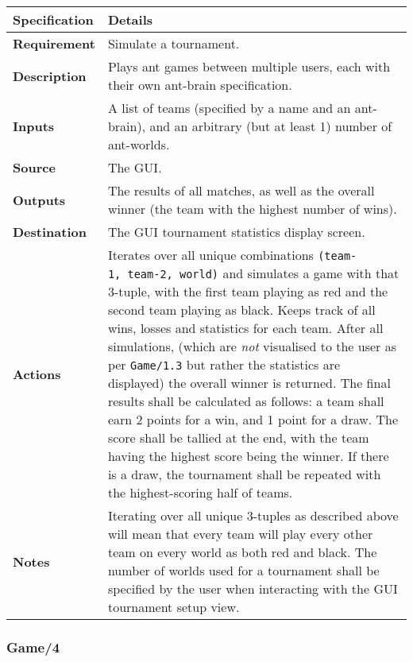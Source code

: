 \documentclass[11pt]{article}
\begin{document}
\begin{longtable}[c]{@{\extracolsep{\fill}}|p{}|p{}|@{}}
\hline
Specification & Details\tabularnewline
\hline

\textbf{Requirement} & Simulate a tournament.\tabularnewline
\textbf{Description} & Plays ant games between multiple users, each with
their own ant-brain specification.\tabularnewline
\textbf{Inputs} & A list of teams (specified by a name and an
ant-brain), and an arbitrary (but at least 1) number of
ant-worlds.\tabularnewline
\textbf{Source} & The GUI.\tabularnewline
\textbf{Outputs} & The results of all matches, as well as the overall
winner (the team with the highest number of wins).\tabularnewline
\textbf{Destination} & The GUI tournament statistics display
screen.\tabularnewline
\textbf{Actions} & Iterates over all unique combinations
\texttt{(team-1,\ team-2,\ world)} and simulates a game with that
3-tuple, with the first team playing as red and the second team playing
as black. Keeps track of all wins, losses and statistics for each team.
After all simulations, (which are \emph{not} visualised to the user as
per \texttt{Game/1.3} but rather the statistics are displayed) the
overall winner is returned. The final results shall be calculated as
follows: a team shall earn 2 points for a win, and 1 point for a draw.
The score shall be tallied at the end, with the team having the highest
score being the winner. If there is a draw, the tournament shall be
repeated with the highest-scoring half of teams.\tabularnewline
\textbf{Notes} & Iterating over all unique 3-tuples as described above
will mean that every team will play every other team on every world as
both red and black. The number of worlds used for a tournament shall be
specified by the user when interacting with the GUI tournament setup
view.\tabularnewline
\hline
\end{longtable}

\subsubsection*{Game/4}\label{game4}
\end{document}
